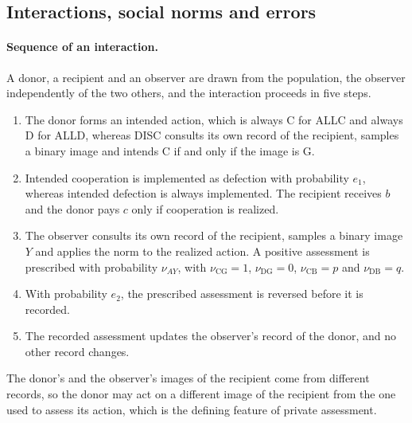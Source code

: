 \documentclass[10pt]{wlscirep}
\theoremstyle{plain}
\theoremstyle{remark}
\begin{document}
\subsection{Interactions, social norms and errors}
\label{si:interactions}

\paragraph{Sequence of an interaction.} A donor, a recipient and an observer are drawn from the population, the observer independently of the two others, and the interaction proceeds in five steps.
\begin{enumerate}
\item The donor forms an intended action, which is always C for ALLC and always D for ALLD, whereas DISC consults its own record of the recipient, samples a binary image and intends C if and only if the image is G.
\item Intended cooperation is implemented as defection with probability $e_1$, whereas intended defection is always implemented. The recipient receives $b$ and the donor pays $c$ only if cooperation is realized.
\item The observer consults its own record of the recipient, samples a binary image $Y$ and applies the norm to the realized action. A positive assessment is prescribed with probability $\nu_{AY}$, with $\nu_{\mathrm{CG}}=1$, $\nu_{\mathrm{DG}}=0$, $\nu_{\mathrm{CB}}=p$ and $\nu_{\mathrm{DB}}=q$.
\item With probability $e_2$, the prescribed assessment is reversed before it is recorded.
\item The recorded assessment updates the observer's record of the donor, and no other record changes.
\end{enumerate}
The donor's and the observer's images of the recipient come from different records, so the donor may act on a different image of the recipient from the one used to assess its action, which is the defining feature of private assessment.
\end{document}
